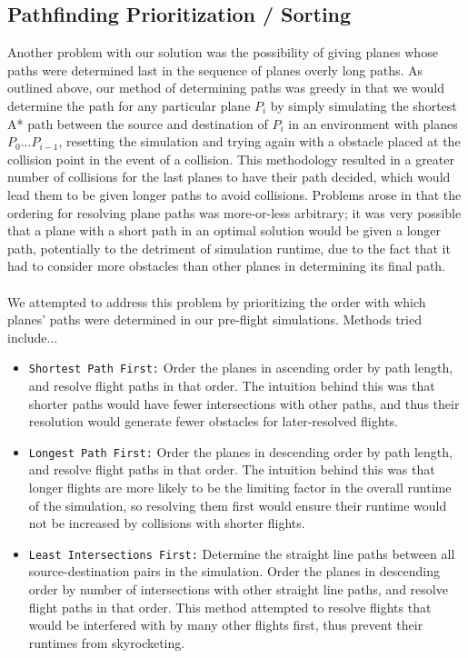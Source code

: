 \documentclass[10pt]{article}
\newcommand{\ms}[1] {
  \texttt{#1}
}
\begin{document}
\subsection{Pathfinding Prioritization / Sorting}

Another problem with our solution was the possibility of giving planes whose paths were 
determined last in the sequence of planes overly long paths. As outlined above, our
method of determining paths was greedy in that we would determine the path for any 
particular plane $P_i$ by simply simulating the shortest A* path between the source
and destination of $P_i$ in an environment with planes $P_0$...$P_{i-1}$, resetting
the simulation and trying again with a obstacle placed at the collision point in the
event of a collision. This methodology resulted in a greater number of collisions for the
last planes to have their path decided, which would lead them to be given longer paths to
avoid collisions. Problems arose in that the ordering for resolving plane paths was more-or-less
arbitrary; it was very possible that a plane with a short path in an optimal solution would be
given a longer path, potentially to the detriment of simulation runtime, due to the fact
that it had to consider more obstacles than other planes in determining its final path.\\\\
We attempted to address this problem by prioritizing the order with which planes' paths 
were determined in our pre-flight simulations. Methods tried include...
\begin{itemize}
  \item \ms{Shortest Path First:} Order the planes in ascending order by path length, and 
    resolve flight paths in that order. The intuition behind this was that shorter paths
    would have fewer intersections with other paths, and thus their resolution would generate
    fewer obstacles for later-resolved flights.
  \item \ms{Longest Path First:} Order the planes in descending order by path length, and
    resolve flight paths in that order. The intuition behind this was that longer flights
    are more likely to be the limiting factor in the overall runtime of the simulation, 
    so resolving them first would ensure their runtime would not be increased by collisions
    with shorter flights.
  \item \ms{Least Intersections First:} Determine the straight line paths between all
    source-destination pairs in the simulation. Order the planes in descending order by
    number of intersections with other straight line paths, and resolve flight paths in 
    that order. This method attempted to resolve flights that would be interfered with 
    by many other flights first, thus prevent their runtimes from skyrocketing.
\end{itemize}
\end{document}
